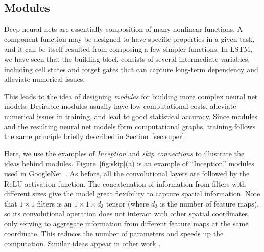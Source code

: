 \subsection{Modules}\label{sec:skip}

Deep neural nets are essentially composition of many nonlinear functions. A component function may be designed to have specific properties in a given task, and it can be itself resulted from composing a few simpler functions. In LSTM, we have seen that the building block consists of several intermediate variables, including cell states and forget gates that can capture long-term dependency and alleviate numerical issues. 

This leads to the idea of designing \textit{modules} for building more complex neural net models. Desirable modules usually have low computational costs, alleviate numerical issues in training, and lead to good statistical accuracy. Since modules and the resulting neural net models form computational graphs, training follows the same principle briefly described in Section~\ref{sec:super}.

Here, we use the examples of \emph{Inception} and \emph{skip connections} to illustrate the ideas behind modules. 
Figure~\ref{fig:skip}(a) is an example of ``Inception'' modules used in GoogleNet~\citep{szegedy2015going}. As before, all the convolutional layers are followed by the ReLU activation function. The concatenation of information from filters with different sizes give the model great flexibility to capture spatial information. Note that $1 \times 1$ filters is an $1 \times 1 \times d_3$ tensor (where $d_3$ is the number of feature maps), so its convolutional operation does not interact with other spatial coordinates, only serving to aggregate information from different feature maps at the same coordinate. This reduces the number of parameters and speeds up the computation. Similar ideas appear in other work \citep{lin2013network, iandola2016squeezenet}.


